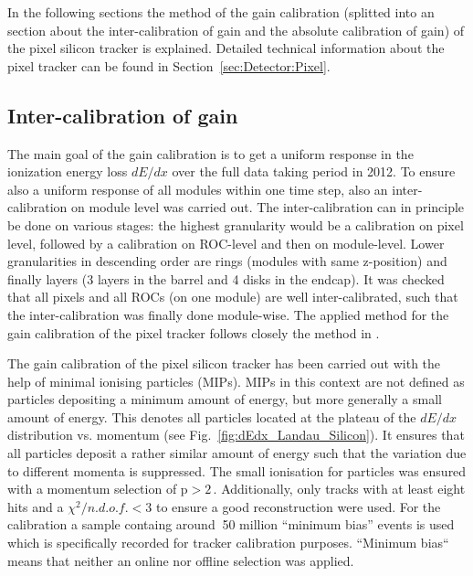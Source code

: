 In the following sections the method of the gain calibration (splitted into an section about the inter-calibration of gain and the absolute calibration of gain) of the pixel silicon tracker is explained. 
Detailed technical information about the pixel tracker can be found in Section~\ref{sec:Detector:Pixel}.


\subsection*{Inter-calibration of gain}
The main goal of the gain calibration is to get a uniform response in the ionization energy loss $dE/dx$ over the full data taking period in 2012.
To ensure also a uniform response of all modules within one time step, also an inter-calibration on module level was carried out.
The inter-calibration can in principle be done on various stages: the highest granularity would be a calibration on pixel level, followed by a calibration on ROC-level and then on module-level.
Lower granularities in descending order are rings (modules with same z-position) and finally layers (3 layers in the barrel and 4 disks in the endcap). 
It was checked that all pixels and all ROCs (on one module) are well inter-calibrated, such that the inter-calibration was finally done module-wise.
The applied method for the gain calibration of the pixel tracker follows closely the method in \cite{bib:Quertenmont_2010}.

The gain calibration of the pixel silicon tracker has been carried out with the help of minimal ionising particles (MIPs).
MIPs in this context are not defined as particles depositing a minimum amount of energy, but more generally a small amount of energy.
This denotes all particles located at the plateau of the $dE/dx$ distribution vs. momentum (see Fig.~\ref{fig:dEdx_Landau_Silicon}).
It ensures that all particles deposit a rather similar amount of energy such that the variation due to different momenta is suppressed.
The small ionisation for particles was ensured with a momentum selection of $\text{p}>2\,$\gev.
Additionally, only tracks with at least eight hits and a $\chi^2/n.d.o.f.<3$ to ensure a good reconstruction were used.
For the calibration a sample containg around $~$50 million ``minimum bias'' events is used which is specifically recorded for tracker calibration purposes.
``Minimum bias`` means that neither an online nor offline selection was applied.

